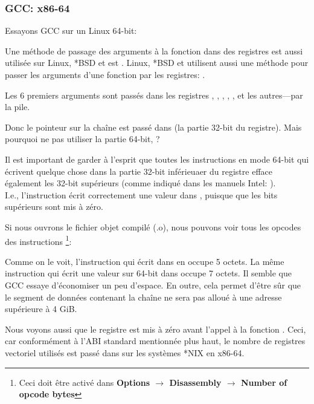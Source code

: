 \subsubsection{GCC: x86-64}

Essayons GCC sur un Linux 64-bit:



Une méthode de passage des arguments à la fonction dans des registres est aussi utilisée sur Linux, *BSD et
\MacOSX est \SysVABI.
Linux, *BSD et \MacOSX utilisent aussi une méthode pour passer les arguments d'une
fonction par les registres: \SysVABI{}.

Les 6 premiers arguments sont passés dans les registres \RDI, \RSI, \RDX, \RCX, ,  et les autres---par
la pile.

Donc le pointeur sur la chaîne est passé dans \EDI (la partie 32-bit du registre).
Mais pourquoi ne pas utiliser la partie 64-bit, \RDI?

Il est important de garder à l'esprit que toutes les instructions \MOV en mode 64-bit qui écrivent quelque chose
dans la partie 32-bit inférieuaer du registre efface également les 32-bit supérieurs (comme indiqué dans les manuels Intel:
).\\
I.e., l'instruction  écrit correctement une valeur dans \RAX, puisque que les bits supérieurs
sont mis à zéro.

Si nous ouvrons le fichier objet compilé (.o), nous pouvons voir tous les opcodes des instructions
\footnote{Ceci doit être activé dans \textbf{Options $\rightarrow$ Disassembly $\rightarrow$ Number of opcode bytes}}:



\label{hw_EDI_instead_of_RDI}
Comme on le voit, l'instruction qui écrit dans \EDI en  occupe 5 octets.
La même instruction qui écrit une valeur sur 64-bit dans \RDI occupe 7 octets.
Il semble que GCC essaye d'économiser un peu d'espace.
En outre, cela permet d'être sûr que le segment de données contenant la chaîne ne sera pas alloué à une adresse supérieure
à 4 \gls{GiB}.

\label{SysVABI_input_EAX}
Nous voyons aussi que le registre \EAX est mis à zéro avant l'appel à la fonction \printf.
Ceci, car conformément à l'\ac{ABI} standard mentionnée plus haut,
le nombre de registres vectoriel utilisés est passé dans \EAX sur les systèmes *NIX en x86-64.

